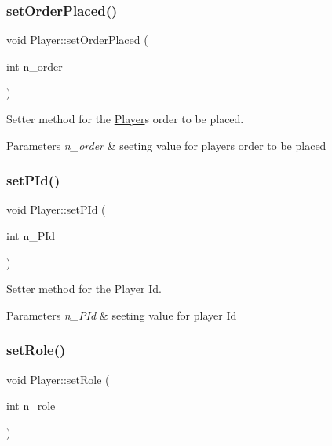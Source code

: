 \subsubsection{\texorpdfstring{set\+Order\+Placed()}{setOrderPlaced()}}
{\footnotesize\ttfamily void Player\+::set\+Order\+Placed (\begin{DoxyParamCaption}\item[{int}]{n\+\_\+order }\end{DoxyParamCaption})}



Setter method for the \hyperlink{class_player}{Player}\textquotesingle{}s order to be placed. 


\begin{DoxyParams}{Parameters}
{\em n\+\_\+order} & seeting value for player\textquotesingle{}s order to be placed \\
\hline
\end{DoxyParams}
\mbox{\label{class_player_a534f0e79b1e7a6310f3d02e04b95b4b4}} 
\subsubsection{\texorpdfstring{set\+P\+Id()}{setPId()}}
{\footnotesize\ttfamily void Player\+::set\+P\+Id (\begin{DoxyParamCaption}\item[{int}]{n\+\_\+\+P\+Id }\end{DoxyParamCaption})}



Setter method for the \hyperlink{class_player}{Player} Id. 


\begin{DoxyParams}{Parameters}
{\em n\+\_\+\+P\+Id} & seeting value for player Id \\
\hline
\end{DoxyParams}
\mbox{\label{class_player_a5def6f94584d296aaba2d620697a8922}} 
\subsubsection{\texorpdfstring{set\+Role()}{setRole()}}
{\footnotesize\ttfamily void Player\+::set\+Role (\begin{DoxyParamCaption}\item[{int}]{n\+\_\+role }\end{DoxyParamCaption})}



